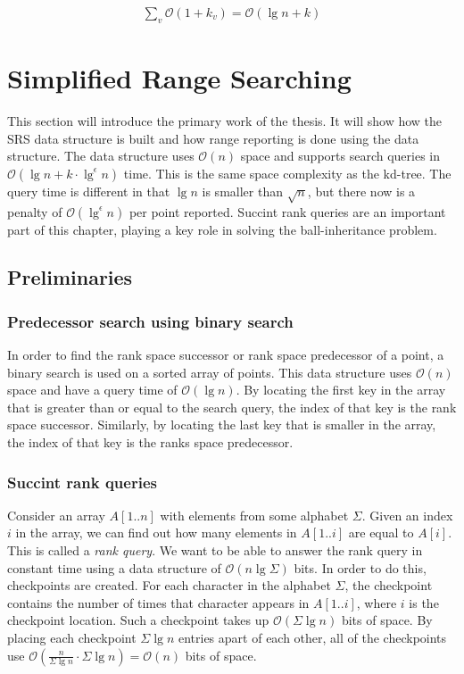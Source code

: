 \begin{align*}
  \sum\limits_{v} \mathcal{O}(1 + k_v) = \mathcal{O}(\lg n + k)
\end{align*}


\section{Simplified Range Searching}

This section will introduce the primary work of the thesis.  It will show how the SRS data structure is built and how range reporting is done using the data structure. The data structure uses $\mathcal{O}(n)$ space and supports search queries in $\mathcal{O}(\lg n + k\cdot \lg^\epsilon n)$ time. This is the same space complexity as the kd-tree. The query time is different in that $\lg n$ is smaller than $\sqrt{n}$, but there now is a penalty of $\mathcal{O}(\lg^\epsilon n)$ per point reported. Succint rank queries are an important part of this chapter, playing a key role in solving the ball-inheritance problem. 


\subsection{Preliminaries}

\subsubsection{Predecessor search using binary search}
In order to find the rank space successor or rank space predecessor of a point, a binary search is used on a sorted array of points. This data structure uses $\mathcal{O}(n)$ space and have a query time of $\mathcal{O}(\lg n)$. By locating the first key in the array that is greater than or equal to the search query, the index of that key is the rank space successor. Similarly, by locating the last key that is smaller in the array, the index of that key is the ranks space predecessor.

\subsubsection{Succint rank queries}
Consider an array $A[1..n]$ with elements from some alphabet $\Sigma$. Given an index $i$ in the array, we can find out how many elements in $A[1..i]$ are equal to $A[i]$. This is called a \emph{rank query}. We want to be able to answer the rank query in constant time using a data structure of $\mathcal{O}(n \lg \Sigma)$ bits. In order to do this, checkpoints are created. For each character in the alphabet $\Sigma$, the checkpoint contains the number of times that character appears in $A[1..i]$, where $i$ is the checkpoint location. Such a checkpoint takes up $\mathcal{O}(\Sigma \lg n)$ bits of space. By placing each checkpoint $\Sigma \lg n$ entries apart of each other, all of the checkpoints use $\mathcal{O}(\frac{n}{\Sigma \lg n} \cdot \Sigma \lg n) = \mathcal{O}(n)$ bits of space.

